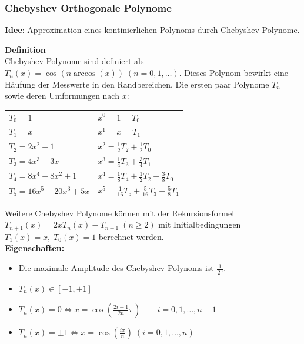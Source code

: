 \subsubsection{Chebyshev Orthogonale Polynome}
\textbf{Idee}: Approximation eines kontinierlichen Polynoms durch Chebyshev-Polynome.

\textbf{Definition}\\
Chebyshev Polynome sind definiert als $T_n(x) = \cos(n \arccos(x))\;(n = 0,1,\ldots)$. Dieses 
Polynom bewirkt eine Häufung der Messwerte in den Randbereichen. Die
ersten paar Polynome $T_n$ sowie deren Umformungen nach $x$:\\
\begin{tabular}{ll}
  $T_0 = 1$ & $x^0 = 1 = T_0$ \\
  $T_1 = x$ & $x^1 = x = T_1$ \\
  $T_2 = 2x^2 -1$ & $x^2 = \frac12 T_2 + \frac12 T_0$ \\
  $T_3 = 4x^3 - 3x$ & $x^3 = \frac14 T_3 + \frac34 T_1$\\
  $T_4 = 8x^4 -8x^2 + 1$ & $x^4 = \frac18 T_4 + \frac12 T_2 + \frac38 T_0$\\
  $T_5 = 16x^5 - 20x^3 + 5x$ & $x^5 = \frac{1}{16} T_5 + \frac{5}{16} T_3 + \frac58 T_1$\\
\end{tabular}

Weitere Chebyshev Polynome können mit der Rekursionsformel $T_{n+1}(x) = 2x T_n(x)-T_{n-1}\;(n\geq2)$
mit Initialbedingungen $T_1(x)=x,\;T_0(x)=1$ berechnet werden.\\

\textbf{Eigenschaften: }
\begin{itemize}
  \item Die maximale Amplitude des Chebyshev-Polynoms ist $\frac{1}{2^n}$.
  \item $T_n(x) \in [-1,+1]$
  \item $T_n(x)=0 \Leftrightarrow x=\cos(\frac{2i+1}{2n}\pi)\qquad i=0,1,\ldots,n-1$
  \item $T_n(x)= \pm 1 \Leftrightarrow x=\cos(\frac{i\pi}{n}) \; (i=0,1,\ldots,n)$
\end{itemize}

